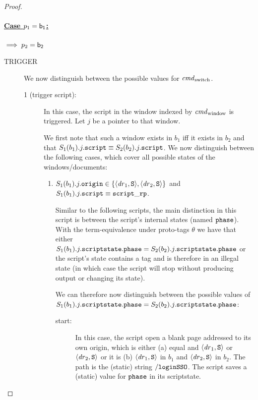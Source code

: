 \begin{proof}
    \paragraph{\underline{Case $p_1 = \mathsf{b_1}$:}} 
    $\implies p_2 = \mathsf{b_2}$ 
  
  
    \begin{description}
      \item[TRIGGER] We now distinguish between the possible 
        values for $\mathit{cmd}_\text{switch}$.
        \begin{description}
        \item[1 (trigger script):] In this case, the script in 
          the window indexed by $\mathit{cmd}_\text{window}$ is 
          triggered. Let $j$ be a pointer to that window.
  
          We first note that such a window exists in $b_1$ iff 
          it exists in $b_2$ and that $S_1(b_1).j.\mathtt{script} 
          \equiv S_2(b_2).j.\mathtt{script}$. We now distinguish 
          between the following cases, which cover all possible 
          states of the windows/documents:
  
          \begin{enumerate}
          \item
            $S_1(b_1).j.\mathtt{origin} \in \{\langle\mathit{dr}_1, 
            \mathtt{S}\rangle, \langle\mathit{dr}_2, \mathtt{S}\rangle\}$ and 
            $S_1(b_1).j.\mathtt{script} \equiv \mathtt{script\_rp}$.
  
            Similar to the following scripts, the main 
            distinction in this script is between the script's 
            internal states (named $\mathtt{phase}$). With the 
            term-equivalence under proto-tags $\theta$ we have 
            that either 
            $S_1(b_1).j.\mathtt{scriptstate}.\mathtt{phase} =
             S_2(b_2).j.\mathtt{scriptstate}.\mathtt{phase}$ or the 
            script's state contains a tag and is therefore in an 
            illegal state (in which case the script will stop 
            without producing output or changing its state).
  
            We can therefore now distinguish between the 
            possible values of
            $S_1(b_1).j.\mathtt{scriptstate}.\mathtt{phase} =
             S_2(b_2).j.\mathtt{scriptstate}.\mathtt{phase}$:
            \begin{description}
            \item[start:] In this case, the script open a blank
              page addressed to its own origin, which is either 
              (a) equal and $\langle\mathit{dr}_1,\mathtt{S}\rangle$ or 
              $\langle\mathit{dr}_2,\mathtt{S}\rangle$ or it is 
              (b) $\langle\mathit{dr}_1,\mathtt{S}\rangle$ in $b_1$ and
              $\langle\mathit{dr}_2,\mathtt{S}\rangle$ in $b_2$. The path is the 
              (static) string $\mathtt{/loginSSO}$. The script 
              saves a (static) value for $\mathtt{phase}$ in its 
              scriptstate.
  

\end{description}
\end{enumerate}
\end{description}
\end{description}
\end{proof}
